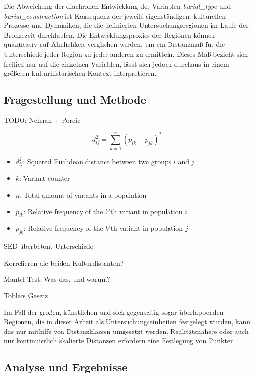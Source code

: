 \documentclass[openany,twoside,twocolumn]{book}
\providecommand{\tightlist}{%
  \setlength{\itemsep}{0pt}\setlength{\parskip}{0pt}}
\begin{document}
Die Abweichung der diachronen Entwicklung der Variablen
\emph{burial\_type} und \emph{burial\_construction} ist Konsequenz der
jeweils eigenständigen, kulturellen Prozesse und Dynamiken, die die
definierten Untersuchungsregionen im Laufe der Bronzezeit durchlaufen.
Die Entwicklungsproxies der Regionen können quantitativ auf Ähnlichkeit
verglichen werden, um ein Distanzmaß für die Unterschiede jeder Region
zu jeder anderen zu ermitteln. Dieses Maß bezieht sich freilich nur auf
die einzelnen Variablen, lässt sich jedoch durchaus in einem größeren
kulturhistorischen Kontext interpretieren.

\hypertarget{fragestellung-und-methode}{%
\subsection{Fragestellung und Methode}\label{fragestellung-und-methode}}

TODO: Neiman + Porcic

\[d_{ij}^2 = \sum_{k = 1}^{n} (p_{ik} - p_{jk})^2\]

\begin{itemize}
\tightlist
\item
  \(d_{ij}^2\): Squared Euclidean distance between two groups \(i\) and
  \(j\)
\item
  \(k\): Variant counter
\item
  \(n\): Total amount of variants in a population
\item
  \(p_{ik}\): Relative frequency of the \(k\)'th variant in population
  \(i\)
\item
  \(p_{jk}\): Relative frequency of the \(k\)'th variant in population
  \(j\)
\end{itemize}

SED überbetont Unterschiede

Korrelieren die beiden Kulturdistanten?

Mantel Test: Was das, und warum?

Toblers Gesetz

Im Fall der großen, künstlichen und sich gegenseitig sogar überlappenden
Regionen, die in dieser Arbeit als Untersuchungseinheiten festgelegt
wurden, kann das nur mithilfe von Distanzklassen umgesetzt werden.
Realitätsnähere oder auch nur kontinuierlich skalierte Distanzen
erfordern eine Festlegung von Punkten

\hypertarget{analyse-und-ergebnisse}{%
\subsection{Analyse und Ergebnisse}\label{analyse-und-ergebnisse}}
\end{document}
